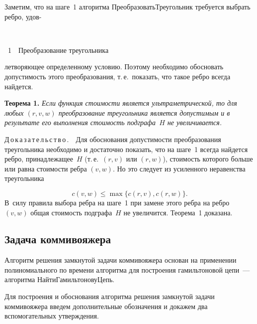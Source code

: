 \begin{multicols}{2}
Заметим, что на шаге~1 алгоритма {\sf ПреобразоватьТреугольник} требуется выбрать
ребро, удов-\linebreak\vspace*{-12pt}
\noindent
\begin{center}  %
\mbox{%
\epsfxsize=72.364mm
}
  \vspace*{5pt}

{{\figurename~1}\ \ \small{Преобразование треугольника}}
  \end{center}

\vspace*{8pt}

\addtocounter{figure}{1}

\noindent
ле\-творяющее определенному
условию. Поэтому необходимо обосновать допустимость этого преобразования, т.\,е.\ показать,
что такое ребро всегда \mbox{найдется}.

\smallskip

\noindent
\textbf{Теорема 1.} \textit{Если
функция стоимости является ультра\-мет\-ри\-че\-ской, то для любых $(r,v,w)$
преобразование треугольника является допустимым и в результате его выполнения
стоимость подграфа~$H$ не увеличивается.}

\smallskip

\noindent
Д\,о\,к\,а\,з\,а\,т\,е\,л\,ь\,с\,т\,в\,о\,.\ \
Для обоснования допустимости преобразования
треугольника необходимо и достаточно показать, что на шаге~1 всегда
найдется ребро, принадлежащее~$H$ (т.\,е.\ $(r,v)$ или $(r,w)$),
стоимость которого больше или равна стоимости ребра $(v,w)$. Но это
следует из усиленного неравенства треугольника

\noindent
$$
c(v,w)  \leq  \max\{c(r,v), c(r,w)\}.
$$
В~силу правила выбора ребра на шаге~1 при замене этого ребра на ребро $(v,w)$
общая стоимость подграфа~$H$ не увеличится.
Теорема~1 доказана.


\subsection{Задача коммивояжера}

Алгоритм решения замкнутой задачи коммивояжера основан на применении
полиномиального по времени алгоритма для построения гамильтоновой цепи~---
алгоритма {\sf НайтиГамильтоновуЦепь}.

Для построения и обоснования алгоритма решения замкнутой задачи коммивояжера
введем дополнительные обозначения и докажем два вспомогательных утверждения.


\end{multicols}
